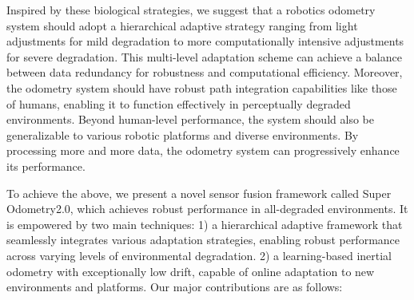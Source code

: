 

Inspired by these biological strategies, we suggest that a robotics odometry system should adopt a hierarchical adaptive strategy ranging from light adjustments for mild degradation to more computationally intensive adjustments for severe degradation. This multi-level adaptation scheme can achieve a balance between data redundancy for robustness and computational efficiency.
Moreover, the odometry system should have robust path integration capabilities like those of humans, enabling it to function effectively in perceptually degraded environments. Beyond human-level performance, the system should also be generalizable to various robotic platforms and diverse environments. By processing more and more data, the odometry system can progressively enhance its performance.


To achieve the above, we present a novel sensor fusion framework called Super Odometry2.0, which achieves robust performance in all-degraded environments. It is empowered by two main techniques: 1) a hierarchical adaptive framework that seamlessly integrates various adaptation strategies, enabling robust performance across varying levels of environmental degradation. 2) a learning-based inertial odometry with exceptionally low drift, capable of online adaptation to new environments and platforms.  
Our major contributions are as follows:





